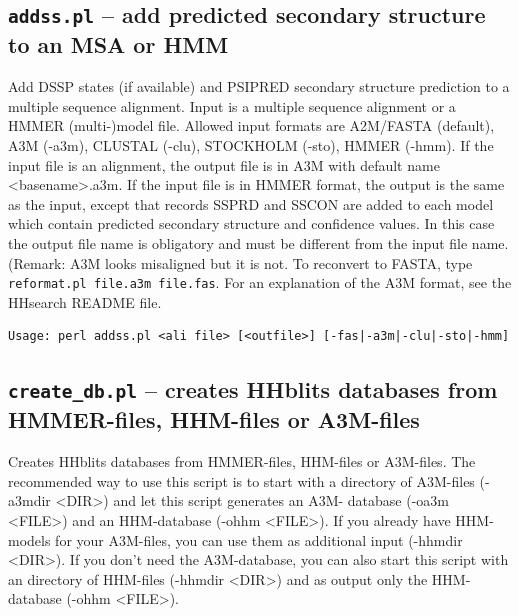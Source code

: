\documentclass[11pt,a4paper]{article}
\begin{document}
\subsection{{\tt addss.pl} -- add predicted secondary structure to an MSA or HMM}
Add DSSP states (if available) and PSIPRED secondary structure prediction to a multiple sequence alignment.
Input is a  multiple sequence alignment or a HMMER (multi-)model file. Allowed input formats are 
A2M/FASTA (default), A3M (-a3m), CLUSTAL (-clu), STOCKHOLM (-sto), HMMER (-hmm).
If the input file is an alignment, the output file is in A3M with default name <basename>.a3m.
If the input file is in HMMER format, the output is the same as the input, except that records 
SSPRD and SSCON are added to each model which contain predicted secondary structure and 
confidence values. In this case the output file name is obligatory and must be different from the 
input file name. (Remark: A3M looks misaligned but it is not. To reconvert to FASTA, type  
\verb`reformat.pl file.a3m file.fas`. For an explanation of the A3M format, see the HHsearch 
README file.     

\small \begin{verbatim}
Usage: perl addss.pl <ali file> [<outfile>] [-fas|-a3m|-clu|-sto|-hmm] 
\end{verbatim} \normalsize

\subsection{{\tt create\_db.pl} -- creates HHblits databases from HMMER-files, HHM-files or A3M-files}

Creates HHblits databases from HMMER-files, HHM-files or A3M-files.
The recommended way to use this script is to start with a directory
of A3M-files (-a3mdir <DIR>) and let this script generates an A3M-
database (-oa3m <FILE>) and an HHM-database (-ohhm <FILE>).
If you already have HHM-models for your A3M-files, you can use them 
as additional input (-hhmdir <DIR>).
If you don't need the A3M-database, you can also start this script
with an directory of HHM-files (-hhmdir <DIR>) and as output only
the HHM-database (-ohhm <FILE>).
\end{document}
